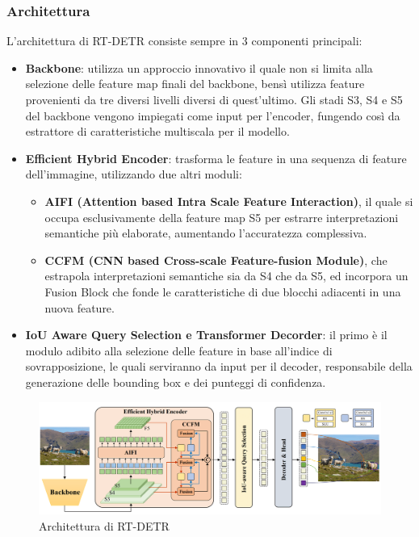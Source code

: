 \subsubsection{Architettura}
L'architettura di RT-DETR consiste sempre in 3 componenti principali:
\begin{itemize}
  \item \textbf{Backbone}: utilizza un approccio innovativo il quale non si limita alla selezione delle feature map finali del backbone, bensì utilizza feature provenienti da tre diversi livelli diversi di quest'ultimo. Gli stadi S3, S4 e S5 del backbone vengono impiegati come input per l'encoder, fungendo così da estrattore di caratteristiche multiscala per il modello.
  \item \textbf{Efficient Hybrid Encoder}: trasforma le feature in una sequenza di feature dell'immagine, utilizzando due altri moduli:
  \begin{itemize}
    \item \textbf{AIFI (Attention based Intra Scale Feature Interaction)}, il quale si occupa esclusivamente della feature map S5 per estrarre interpretazioni semantiche più elaborate, aumentando l'accuratezza complessiva.
    \item \textbf{CCFM (CNN based Cross-scale Feature-fusion Module)}, che estrapola interpretazioni semantiche sia da S4 che da S5, ed incorpora un Fusion Block che fonde le caratteristiche di due blocchi adiacenti in una nuova feature.
  \end{itemize}
  \item \textbf{IoU Aware Query Selection e Transformer Decorder}: il primo è il modulo adibito alla selezione delle feature in base all'indice di sovrapposizione, le quali serviranno da input per il decoder, responsabile della generazione delle bounding box e dei punteggi di confidenza.
\end{itemize}

\begin{figure}[ht]
    \centering
    \includegraphics[width=1\textwidth]{files/capitoli/2-yolo/assets/rtdetr-architecture.png}
    \caption{\label{fig:rtdetr-architecture}Architettura di RT-DETR\cite{32}}
\end{figure}

